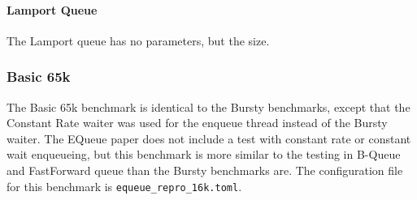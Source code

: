 \paragraph{Lamport Queue}
The Lamport queue has no parameters, but the size.

\subsubsection{Basic 65k}
The Basic 65k benchmark is identical to the Bursty benchmarks, except that the Constant Rate waiter was used
for the enqueue thread instead of the Bursty waiter.
The EQueue paper does not include a test with constant rate or constant wait enqueueing, but this
benchmark is more similar to the testing in B-Queue and FastForward queue than the Bursty benchmarks are.
The configuration file for this benchmark is \texttt{equeue\_repro\_16k.toml}.
